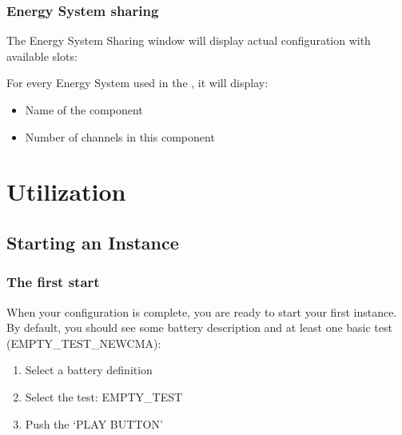 \documentclass[letterpaper,10pt,english]{jupyterBook}
\begin{document}
\section{Energy System sharing}
\label{\detokenize{05_SCALE_Battery-configuration:energy-system-sharing}}
\sphinxAtStartPar
The Energy System Sharing window will display actual configuration with available slots:

\sphinxAtStartPar
{}

\sphinxAtStartPar
For every Energy System used in the {\hyperref[\detokenize{04_Base-configuration::doc}]{}}, it will display:
\begin{itemize}
\item {} 
\sphinxAtStartPar
Name of the component

\item {} 
\sphinxAtStartPar
Number of channels in this component

\end{itemize}


\part{Utilization}


\chapter{Starting an Instance}
\label{\detokenize{06_Starting_An_instance:starting-an-instance}}\label{\detokenize{06_Starting_An_instance::doc}}

\section{The first start}
\label{\detokenize{06_Starting_An_instance:the-first-start}}
\sphinxAtStartPar
When your configuration is complete, you are ready to start your first instance. By default, you should see some battery description and at least one basic test (EMPTY\_TEST\_NEWCMA):

\sphinxAtStartPar
{}
\begin{enumerate}
%
\item {} 
\sphinxAtStartPar
Select a battery definition

\item {} 
\sphinxAtStartPar
Select the test: EMPTY\_TEST

\item {} 
\sphinxAtStartPar
Push the ‘PLAY BUTTON’

\end{enumerate}
\end{document}
